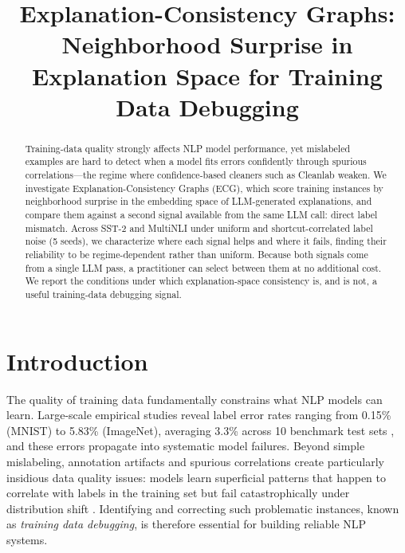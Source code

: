 \documentclass[letterpaper]{article}
\title{Explanation-Consistency Graphs: \\ Neighborhood Surprise in Explanation Space for Training Data Debugging}
\author{}
\begin{document}
\maketitle

\begin{abstract}
Training-data quality strongly affects NLP model performance, yet mislabeled examples are hard to detect when a model fits errors confidently through spurious correlations---the regime where confidence-based cleaners such as Cleanlab weaken. We investigate Explanation-Consistency Graphs (ECG), which score training instances by neighborhood surprise in the embedding space of LLM-generated explanations, and compare them against a second signal available from the same LLM call: direct label mismatch. Across SST-2 and MultiNLI under uniform and shortcut-correlated label noise (5 seeds), we characterize where each signal helps and where it fails, finding their reliability to be regime-dependent rather than uniform. Because both signals come from a single LLM pass, a practitioner can select between them at no additional cost. We report the conditions under which explanation-space consistency is, and is not, a useful training-data debugging signal.
\end{abstract}

\section{Introduction}
\label{sec:intro}

The quality of training data fundamentally constrains what NLP models can learn.
Large-scale empirical studies reveal label error rates ranging from 0.15\% (MNIST) to 5.83\% (ImageNet), averaging 3.3\% across 10 benchmark test sets \citep{northcutt2021pervasive}, and these errors propagate into systematic model failures.
Beyond simple mislabeling, annotation artifacts and spurious correlations create particularly insidious data quality issues: models learn superficial patterns that happen to correlate with labels in the training set but fail catastrophically under distribution shift \citep{gururangan2018annotation, mccoy2019right}.
Identifying and correcting such problematic instances, known as \textit{training data debugging}, is therefore essential for building reliable NLP systems.
\end{document}
